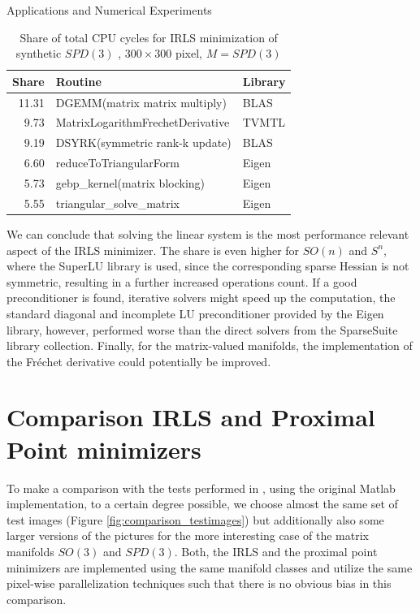 \begin{chapter}{Applications and Numerical Experiments}
\begin{table}[h!]
\centering
\footnotesize
\begin{tabular}{rll}
\hline
Share & Routine & Library\\
\hline
11.31& DGEMM(matrix matrix multiply)& BLAS\\
9.73& MatrixLogarithmFrechetDerivative& TVMTL\\
9.19& DSYRK(symmetric rank-k update)& BLAS\\
6.60& reduceToTriangularForm& Eigen\\
5.73& gebp\_kernel(matrix blocking)& Eigen\\
5.55& triangular\_solve\_matrix& Eigen\\
\hline
\end{tabular}
\caption{Share of total CPU cycles for IRLS minimization of synthetic $SPD(3)$ , $300\times 300$ pixel, $M=SPD(3)$
\label{table:perf_spd300}
}
\end{table}

We can conclude that solving the linear system is the most performance relevant aspect of the IRLS minimizer. The share is even higher for $SO(n)$ and $S^n$, where the SuperLU library is used, 
since the corresponding sparse Hessian is not symmetric, resulting in a further increased operations count. If a good preconditioner is found, iterative solvers might speed up the computation, 
the standard diagonal and incomplete LU preconditioner provided by the Eigen library, however, performed worse than the direct solvers from the SparseSuite library collection. Finally, for
the matrix-valued manifolds, the implementation of the Fr\'{e}chet derivative could potentially be improved.




\FloatBarrier
\section{Comparison IRLS and Proximal Point minimizers} %
\label{sec:Comparison IRLS and Proximal Point minimizers}

To make a comparison with the tests performed in \cite{SprecherIRLS}, using the original Matlab implementation, to a certain degree possible, we choose 
almost the same set of test images (Figure \ref{fig:comparison_testimages}) but additionally also some larger versions of the pictures for the more interesting 
case of the matrix manifolds $SO(3)$ and $SPD(3)$. Both, the IRLS and the proximal point minimizers are implemented using the same manifold classes and utilize the
same pixel-wise parallelization techniques such that there is no obvious bias in this comparison.\\


\end{chapter}
